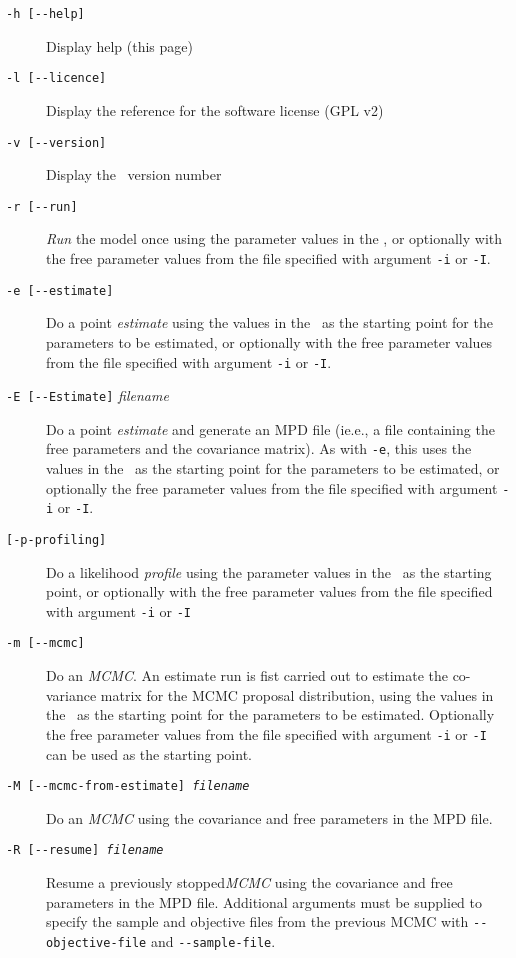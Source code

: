 \begin{description}
\item [\texttt{-h [-{}-help]}] Display help (this page)
\item [\texttt{-l [-{}-licence]}] Display the reference for the software license (GPL v2)
\item [\texttt{-v [-{}-version]}] Display the \CNAME\ version number

\item [\texttt{-r [-{}-run]}] \emph{Run} the model once using the parameter values in the \config, or optionally with the free parameter values from the file specified with argument \texttt{-i} or \texttt{-I}.
\item [\texttt{-e [-{}-estimate]}] Do a point \emph{estimate} using the values in the \config\ as the starting point for the parameters to be estimated, or optionally with the free parameter values from the file specified with argument \texttt{-i} or \texttt{-I}.
\item [\texttt{-E [-{}-Estimate]} \emph{filename}] Do a point \emph{estimate} and generate an MPD file (ie.e., a file containing the free parameters and the covariance matrix). As with \texttt{-e}, this uses the values in the \config\ as the starting point for the parameters to be estimated, or optionally the free parameter values from the file specified with argument \texttt{-i} or \texttt{-I}.
\item [\texttt{[-{p}-profiling]}] Do a likelihood \emph{profile} using the parameter values in the \config\ as the starting point, or optionally with the free parameter values from the file specified with argument \texttt{-i} or \texttt{-I}
\item [\texttt{-m [-{}-mcmc]}] Do an \emph{MCMC}. An estimate run is fist carried out to estimate the co-variance matrix for the MCMC proposal distribution, using the values in the \config\ as the starting point for the parameters to be estimated. Optionally the free parameter values from the file specified with argument \texttt{-i} or \texttt{-I} can be used as the starting point.
\item [\texttt{-M [-{}-mcmc-from-estimate] \emph{filename}}] Do an \emph{MCMC} using the covariance and free parameters in the MPD file.
\item [\texttt{-R [-{}-resume] \emph{filename}}] Resume a previously stopped\emph{MCMC} using the covariance and free parameters in the MPD file. Additional arguments must be supplied to specify the sample and objective files from the previous MCMC with \texttt{-{}-objective-file} and \texttt{-{}-sample-file}.

\end{description}
